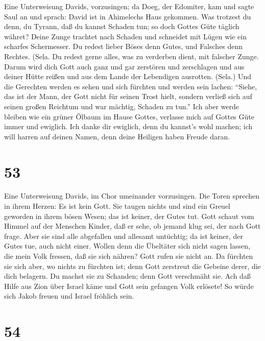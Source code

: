  Eine Unterweisung Davids, vorzusingen; da Doeg, der
Edomiter, kam und sagte Saul an und sprach: David ist in Ahimelechs Haus
gekommen. Was trotzest du denn, du Tyrann, daß du kannst Schaden tun; so
doch Gottes Güte täglich währet?  Deine Zunge trachtet nach
Schaden und schneidet mit Lügen wie ein scharfes Schermesser.
 Du redest lieber Böses denn Gutes, und Falsches denn
Rechtes. (Sela.  Du redest gerne alles, was zu verderben
dient, mit falscher Zunge.  Darum wird dich Gott auch ganz
und gar zerstören und zerschlagen und aus deiner Hütte reißen und aus
dem Lande der Lebendigen ausrotten. (Sela.)  Und die
Gerechten werden es sehen und sich fürchten und werden sein lachen:
 ``Siehe, das ist der Mann, der Gott nicht für seinen Trost
hielt, sondern verließ sich auf seinen großen Reichtum und war mächtig,
Schaden zu tun.''  Ich aber werde bleiben wie ein grüner
Ölbaum im Hause Gottes, verlasse mich auf Gottes Güte immer und
ewiglich.  Ich danke dir ewiglich, denn du kannst's wohl
machen; ich will harren auf deinen Namen, denn deine Heiligen haben
Freude daran.

\hypertarget{section-52}{%
\section{53}\label{section-52}}

 Eine Unterweisung Davids, im Chor umeinander vorzusingen.
Die Toren sprechen in ihrem Herzen: Es ist kein Gott. Sie taugen nichts
und sind ein Greuel geworden in ihrem bösen Wesen; das ist keiner, der
Gutes tut.  Gott schaut vom Himmel auf der Menschen Kinder,
daß er sehe, ob jemand klug sei, der nach Gott frage.  Aber
sie sind alle abgefallen und allesamt untüchtig; da ist keiner, der
Gutes tue, auch nicht einer.  Wollen denn die Übeltäter sich
nicht sagen lassen, die mein Volk fressen, daß sie sich nähren? Gott
rufen sie nicht an.  Da fürchten sie sich aber, wo nichts zu
fürchten ist; denn Gott zerstreut die Gebeine derer, die dich belagern.
Du machst sie zu Schanden; denn Gott verschmäht sie.  Ach
daß Hilfe aus Zion über Israel käme und Gott sein gefangen Volk
erlösete! So würde sich Jakob freuen und Israel fröhlich sein.

\hypertarget{section-53}{%
\section{54}\label{section-53}}

